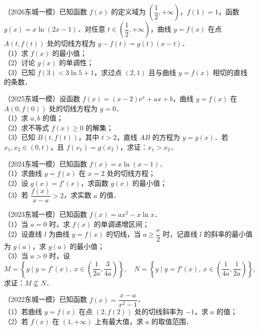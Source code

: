 \begin{example}
（2026东城一模）已知函数 $f(x)$ 的定义域为 $\left(\dfrac12,+\infty\right)$，$f(1)=1$，函数 $g(x)=x\ln(2x-1)$．对任意 $t\in\left(\dfrac12,+\infty\right)$，曲线 $y=f(x)$ 在点 $A(t,f(t))$ 处的切线方程为 $y-f(t)=g(t)(x-t)$．\\
（1）求 $f(x)$ 的最小值；\\
（2）讨论 $g(x)$ 的单调性；\\
（3）已知 $f(3)<3\ln5+1$，求过点 $(2,1)$ 且与曲线 $y=f(x)$ 相切的直线的条数．
\end{example}

\begin{example}
（2025东城一模）设函数 $f(x)=(x-2)\mathrm{e}^x+ax+b$，曲线 $y=f(x)$ 在 $A(0,f(0))$ 处的切线方程为 $y=0$．\\
（1）求 $a,b$ 的值；\\
（2）求不等式 $f(x)\geqslant0$ 的解集；\\
（3）已知 $B(t,f(t))$，其中 $t>2$，直线 $AB$ 的方程为 $y=g(x)$．若 $x_1,x_2\in(0,t)$，且 $f(x_1)=g(x_2)$，求证：$x_1>x_2$．
\end{example}

\begin{example}
（2024东城一模）已知函数 $f(x)=x\ln(x-1)$．\\
（1）求曲线 $y=f(x)$ 在 $x=2$ 处的切线方程；\\
（2）设 $g(x)=f'(x)$，求函数 $g(x)$ 的最小值；\\
（3）若 $\dfrac{f(x)}{x-a}>2$，求实数 $a$ 的值．
\end{example}

\begin{example}
（2023东城一模）已知函数 $f(x)=ax^2-x\ln x$．\\
（1）当 $a=0$ 时，求 $f(x)$ 的单调递增区间；\\
（2）设直线 $l$ 为曲线 $y=f(x)$ 的切线，当 $a\geqslant\dfrac{\mathrm{e}}2$ 时，记直线 $l$ 的斜率的最小值为 $g(a)$，求 $g(a)$ 的最小值；\\
（3）当 $a>0$ 时，设
\[
M=\left\{y\mid y=f'(x),\ x\in\left(\dfrac1{2a},\dfrac3{4a}\right)\right\},\quad
N=\left\{y\mid y=f'(x),\ x\in\left(\dfrac1{4a},\dfrac1{2a}\right)\right\},
\]
求证：$M\nsubseteq N$．
\end{example}

\begin{example}
（2022东城一模）已知函数 $f(x)=\dfrac{x-a}{x^2-1}$．\\
（1）若曲线 $y=f(x)$ 在点 $(2,f(2))$ 处的切线斜率为 $-1$，求 $a$ 的值；\\
（2）若 $f(x)$ 在 $(1,+\infty)$ 上有最大值，求 $a$ 的取值范围．
\end{example}

